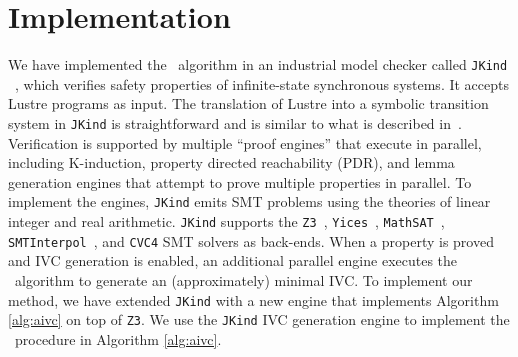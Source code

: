 \section{Implementation}
\label{sec:impl}
We have implemented the \aivcalg ~algorithm
in an industrial model checker called \texttt{JKind} ~\cite{jkind},
which verifies safety properties of  infinite-state synchronous systems.
It accepts Lustre programs \cite{Halbwachs91:lustre} as input.  The translation of Lustre
into a symbolic transition system in \texttt{JKind} is straightforward and is similar to what is described
in~\cite{Hagen08:FMCAD}.
Verification is supported by multiple ``proof engines'' that execute in parallel, including K-induction,
property directed reachability (PDR), and lemma generation engines that attempt to prove
multiple properties in parallel.  To implement the engines,
\texttt{JKind} emits SMT problems using the theories of linear integer and real arithmetic.  \texttt{JKind} supports the
\texttt{Z3}~\cite{DeMoura08:z3},
\texttt{Yices}~\cite{Dutertre06:yices}, \texttt{MathSAT}~\cite{Cimatti2013:MathSAT},
\texttt{SMTInterpol}~\cite{Christ2012:SMTInterpol}, and \texttt{CVC4} \cite{barrett2011cvc4} SMT solvers as back-ends.  When a property is
proved and IVC generation is enabled, an additional parallel engine
executes the \ucalg ~algorithm \cite{Ghass16} to generate an (approximately) minimal IVC.
%
To implement our method, we have extended \texttt{JKind} with a new engine that
implements Algorithm \ref{alg:aivc} on top of \texttt{Z3}.
We use the \texttt{JKind} IVC generation engine to implement the \getivc\ procedure in  Algorithm \ref{alg:aivc}.

